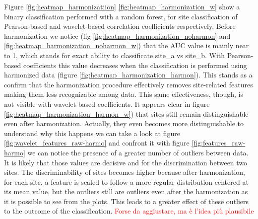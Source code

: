 \documentclass[11pt]{report}
\begin{document}

Figure \ref{fig:heatmap_harmonizatiion} \ref{fig:heatmap_harmonization_w} show a binary classification performed with a random forest, for site classification of Pearson-based and wavelet-based correlation coefficients respectively.
Before harmonization we notice (fig \ref{fig:heatmap_harmonization_noharmon} and \ref{fig:heatmap_harmonization_noharmon_w}) that the AUC value is mainly near to 1, which stands for exact ability to classificate site\_a vs site\_b.
With Pearson-based coefficients this value decreases when the classification is performed using harmonized data (figure \ref{fig:heatmap_harmonization_harmon}).
This stands as a confirm that the harmonization procedure effectively removes site-related features making them less recognizable among data.
This same effectiveness, though, is not visible with wavelet-based coefficients.
It appears clear in figure \ref{fig:heatmap_harmonization_harmon_w}) that sites still remain distinguishable even after harmonization.
Actually, they even becomes more distinguishable to understand why this happens we can take a look at figure \ref{fig:wavelet_features_raw-harmo} and confront it with figure \ref{fig:features_raw-harmo} we can notice the presence of a greater number of outliers between data.
It is likely that those values are decisive and for the discrimination between two sites.
The discriminability of sites becomes higher because after harmonization,  for each site, a feature is scaled to follow a more regular distribution centered at its mean value, but the outliers still are outliers even after the harmonization as it is possible to see from the plots.
This leads to a greater effect of these outliers to the outcome of the classification.
\textcolor{red}{Forse da aggiustare, ma è l'idea più plausibile}

\end{document}
